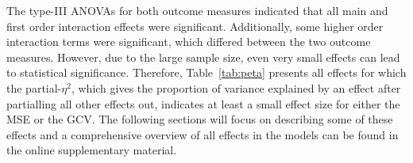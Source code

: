 \documentclass[man, floatsintext]{apa7}
\begin{document}
The type-III ANOVAs for both outcome measures indicated that all main and first
order interaction effects were significant. Additionally, some higher order
interaction terms were significant, which differed between the two outcome
measures. However, due to the large sample size, even very small effects can
lead to statistical significance. Therefore, Table~\ref{tab:peta} presents all
effects for which the partial-$\eta^2$, which gives the proportion of variance
explained by an effect after partialling all other effects out, indicates at
least a small effect size for either the MSE or the GCV\@. The following
sections will focus on describing some of these effects and a comprehensive
overview of all effects in the models can be found in the online supplementary
material.

\begin{table}[tbp] %


\end{table}
\end{document}
